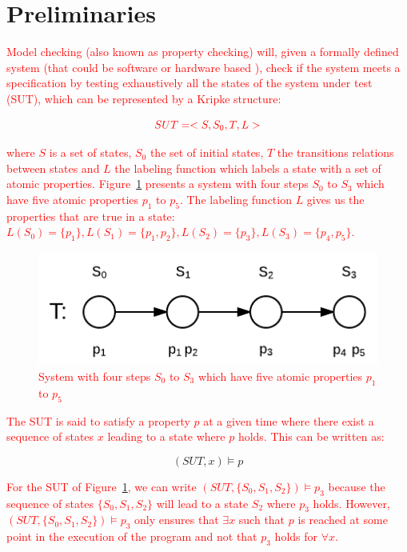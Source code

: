 \documentclass[times, doublespace]{smrauth}
\newcommand{\red}[1]{\textcolor{red}{#1}}
\begin{document}
\section{Preliminaries\label{sec:prelimenaries}}

\red{Model checking (also known as property checking) will, given a formally defined system
(that could be software \cite{Visser2003} or hardware based
\cite{kropf1999introduction}), check if the system meets a specification
by testing exhaustively all the states of the system under test (SUT),
which can be represented by a Kripke \cite{Kripke1963} structure:}

\begin{equation}
\red{SUT = <S, S_0, T, L>}
\end{equation}

\red{\noindent where $S$ is a set of states, $S_0$ the set of initial states, $T$ the transitions relations between states and $L$ the labeling function which labels a state with a set of atomic properties.
Figure~\ref{fig:mc-def} presents a system with four steps $S_0$ to $S_3$ which have five atomic properties $p_1$ to $p_5$.
The labeling function $L$ gives us the properties that are true in a state: $L(S_0) = \{p_1\}, L(S_1) = \{p_1, p_2\}, L(S_2) = \{p_3\}, L(S_3) = \{p_4, p_5\}$.}

\begin{figure}[h!]
  \centering
    \includegraphics[scale=0.4]{media/mc-def.png}
    \caption{\red{System with four steps $S_0$ to $S_3$ which have five atomic properties $p_1$ to $p_5$}
    \label{fig:mc-def}}
\end{figure}


\red{The SUT is said to satisfy a property $p$ at a given time where there exist a sequence of states $x$ leading to a state where $p$ holds.
This can be written as:}

\begin{equation}
(SUT, x) \models p
\end{equation}

\red{For the SUT of Figure~\ref{fig:mc-def}, we can write $(SUT, \{S_0, S_1, S_2\}) \models p_3$ because the sequence of states $\{S_0, S_1, S_2\}$ will lead to a state $S_2$ where $p_3$ holds. However, $(SUT, \{S_0, S_1, S_2\}) \models p_3$ only ensures that $\exists x$ such that $p$ is reached
at some point in the execution of the program and not that $p_3$ holds
for $\forall x$.}
\end{document}
